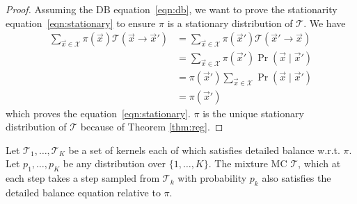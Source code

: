 \begin{proof}
    Assuming the DB equation~\eqref{eqn:db}, we want to prove the stationarity equation~\eqref{eqn:stationary} to ensure $\pi$ is a stationary distribution of $\mathcal T$. We have
    \begin{align}
        \sum_{\vec x \in \mathcal X} \pi(\vec x)\mathcal T(\vec x \to \vec x')  &= \sum_{\vec x \in \mathcal X} \pi(\vec x')\mathcal T(\vec x' \to \vec x) \\
                                                                                &= \sum_{\vec x \in \mathcal X} \pi(\vec x') \Pr(\vec x \mid \vec x') \\
                                                                                &= \pi(\vec x') \sum_{\vec x \in \mathcal X} \Pr(\vec x \mid \vec x') \\
                                                                                &= \pi(\vec x')
    \end{align}
    which proves the equation~\eqref{eqn:stationary}. $\pi$ is the unique stationary distribution of $\mathcal T$ because of Theorem \ref{thm:reg}.
\end{proof}

\begin{proposition}
    Let $\mathcal T_1, \dotsc, \mathcal T_K$ be a set of kernels each of which satisfies detailed balance w.r.t. $\pi$. Let $p_1, \dotsc, p_K$ be any distribution over $\{1, \dotsc, K\}$. The mixture MC $\mathcal T$, which at each step takes a step sampled from $\mathcal T_k$ with probability $p_k$ also satisfies the detailed balance equation relative to $\pi$.
\end{proposition}

